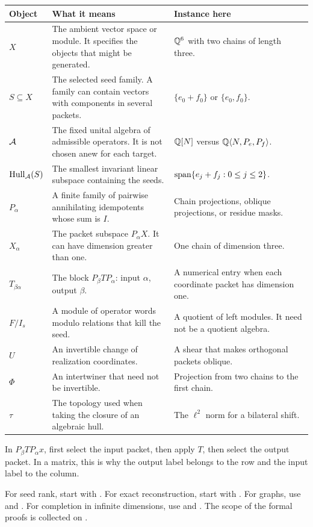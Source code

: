 {\small
\begin{tabularx}{\linewidth}{@{}>{\raggedright\arraybackslash}p{.15\linewidth}Y>{\raggedright\arraybackslash}p{.28\linewidth}@{}}\toprule
\textbf{Object} & \textbf{What it means} & \textbf{Instance here}\\\midrule
$X$ & The ambient vector space or module. It specifies the objects that might be generated. & $\QQ^6$ with two chains of length three.\\
$S\subseteq X$ & The selected seed family. A family can contain vectors with components in several packets. & $\{e_0+f_0\}$ or $\{e_0,f_0\}$.\\
$\AA$ & The fixed unital algebra of admissible operators. It is not chosen anew for each target. & $\QQ[N]$ versus $\QQ\langle N,P_e,P_f\rangle$.\\
$\Hull_{\AA}(S)$ & The smallest invariant linear subspace containing the seeds. & $\Span\{e_j+f_j:0\le j\le2\}$.\\
$P_\alpha$ & A finite family of pairwise annihilating idempotents whose sum is $I$. & Chain projections, oblique projections, or residue masks.\\
$X_\alpha$ & The packet subspace $P_\alpha X$. It can have dimension greater than one. & One chain of dimension three.\\
$T_{\beta\alpha}$ & The block $P_\beta T P_\alpha$: input $\alpha$, output $\beta$. & A numerical entry when each coordinate packet has dimension one.\\
$F/I_s$ & A module of operator words modulo relations that kill the seed. & A quotient of left modules. It need not be a quotient algebra.\\
$U$ & An invertible change of realization coordinates. & A shear that makes orthogonal packets oblique.\\
$\Phi$ & An intertwiner that need not be invertible. & Projection from two chains to the first chain.\\
$\tau$ & The topology used when taking the closure of an algebraic hull. & The $\ell^2$ norm for a bilateral shift.\\\bottomrule
\end{tabularx}}

In $P_\beta T P_\alpha x$, first select the input packet, then apply $T$, then select the output packet. In a matrix, this is why the output label belongs to the row and the input label to the column.

For seed rank, start with . For exact reconstruction, start with . For graphs, use  and . For completion in infinite dimensions, use  and . The scope of the formal proofs is collected on .

